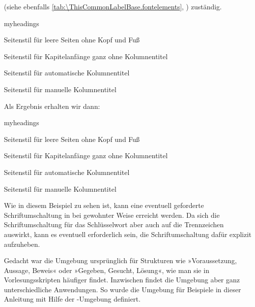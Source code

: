 (siehe
ebenfalls \autoref{tab:\ThisCommonLabelBase.fontelements},
) zuständig.
\IfThisCommonFirstRun{\iftrue}{\par\csname iffalse\endcsname}
  \begin{Example}
\begin{lstcode}
  \begin{labeling}[~--]{myheadings}
    \item[empty] 
      Seitenstil für leere Seiten ohne Kopf und Fuß
    \item[plain] 
      Seitenstil für Kapitelanfänge ganz ohne 
      Kolumnentitel
    \item[headings] 
      Seitenstil für automatische Kolumnentitel
    \item[myheadings]
      Seitenstil für manuelle Kolumnentitel
  \end{labeling}
\end{lstcode}
    Als Ergebnis erhalten wir dann:
    \begin{ShowOutput}
      \begin{labeling}[~--]{myheadings}
      \item[empty] 
        Seitenstil für leere Seiten ohne Kopf und Fuß
      \item[plain] 
        Seitenstil für Kapitelanfänge ganz ohne 
        Kolumnentitel
      \item[headings] 
        Seitenstil für automatische Kolumnentitel
      \item[myheadings]
        Seitenstil für manuelle Kolumnentitel
      \end{labeling}
    \end{ShowOutput}
    Wie in diesem Beispiel zu sehen ist, kann eine eventuell geforderte
    Schriftumschaltung in bei \KOMAScript{} gewohnter Weise erreicht
    werden. Da sich die Schriftumschaltung für das Schlüsselwort aber auch auf
    die Trennzeichen auswirkt, kann es eventuell erforderlich sein, die
    Schriftumschaltung dafür explizit aufzuheben.
  \end{Example}
\fi
\EndIndexGroup
Gedacht war die Umgebung ursprünglich für Strukturen wie »Voraussetzung,
Aussage, Beweis« oder »Gegeben, Gesucht, Lösung«, wie man sie in
Vorlesungsskripten häufiger findet. Inzwischen findet die Umgebung aber ganz
unterschiedliche Anwendungen. So wurde die Umgebung für Beispiele in dieser
Anleitung mit Hilfe der -Umgebung definiert.%
\EndIndexGroup


